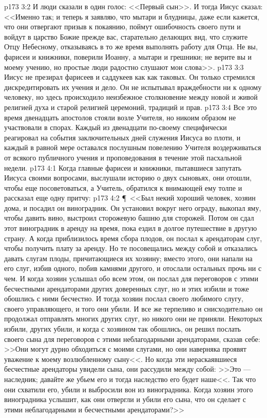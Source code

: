 \vs p173 3:2 И люди сказали в один голос: <<Первый сын>>. И тогда Иисус сказал: <<Именно так; и теперь я заявляю, что мытари и блудницы, даже если кажется, что они отвергают призыв к покаянию, поймут ошибочность своего пути и войдут в царство Божие прежде вас, старательно делающих вид, что служите Отцу Небесному, отказываясь в то же время выполнять работу для Отца. Не вы, фарисеи и книжники, поверили Иоанну, а мытари и грешники; не верите вы и моему учению, но простые люди радостно слушают мои слова>>.
\vs p173 3:3 Иисус не презирал фарисеев и саддукеев как как таковых. Он только стремился дискредитировать их учения и дело. Он не испытывал враждебности ни к одному человеку, но здесь происходило неизбежное столкновение между новой и живой религией духа и старой религией церемоний, традиций и прав.
\vs p173 3:4 Все это время двенадцать апостолов стояли возле Учителя, но никоим образом не участвовали в спорах. Каждый из двенадцати по\hyp{}своему специфически реагировал на события заключительных дней служения Иисуса во плоти, и каждый в равной мере оставался послушным повелению Учителя воздерживаться от всякого публичного учения и проповедования в течение этой пасхальной недели.
\vs p173 4:1 Когда главные фарисеи и книжники, пытавшиеся запутать Иисуса своими вопросами, выслушали историю о двух сыновьях, они отошли, чтобы еще посоветоваться, а Учитель, обратился к внимающей ему толпе и рассказал еще одну притчу:
\vs p173 4:2 \P\ <<Был некий хороший человек, хозяин дома, и посадил он виноградник. Он установил вокруг него ограду, выкопал яму, чтобы давить вино, выстроил сторожевую башню для сторожей. Потом он сдал этот виноградник в аренду на время, пока ездил в долгое путешествие в другую страну. А когда приблизилось время сбора плодов, он послал к арендаторам слуг, чтобы получить плату за аренду. Но те посовещались между собой и отказались давать слугам плоды, причитающиеся их хозяину; вместо этого, они напали на его слуг, избив одного, побив камнями другого, и отослали остальных прочь ни с чем. И когда хозяин услышал обо всем этом, он послал для переговоров с этими бесчестными арендаторами других доверенных слуг, но и этих избили и тоже обошлись с ними бесчестно. И тогда хозяин послал своего любимого слугу, своего управляющего, и того они убили. И все же терпеливо и снисходительно он продолжал отправлять многих других слуг, но никого они не приняли. Некоторых избили, других убили, и когда с хозяином так обошлись, он решил послать своего сына для переговоров с этими неблагодарными арендаторами, сказав себе: >>Они могут дурно обходиться с моими слугами, но они наверняка проявят уважение к моему возлюбленному сыну<<. Но когда эти нераскаявшиеся бесчестные арендаторы увидели сына, они рассудили между собой: >>Это --- наследник; давайте же убьем его и тогда наследство его будет наше<<. Так что они схватили его, убили и выбросили вон из виноградника. Когда хозяин этого виноградника услышит, как они отвергли и убили его сына, что он сделает с этими неблагодарными и бесчестными арендаторами?>>
